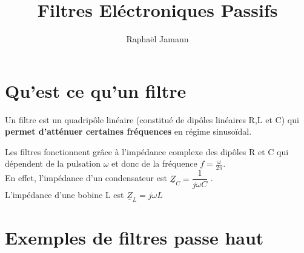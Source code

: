 \documentclass{article}
\title{Filtres Eléctroniques Passifs}
\author{Raphaël Jamann}
\date{} %
\begin{document}
    \maketitle


    \section{Qu'est ce qu'un filtre}
    
    Un filtre est un quadripôle linéaire (constitué de dipôles linéaires R,L et C) qui \textbf{permet
    d'atténuer certaines fréquences} en régime sinusoïdal. 

    \bigskip
    Les filtres fonctionnent grâce à l'impédance complexe des dipôles R et C qui dépendent
    de la pulsation $\omega$ et donc de la fréquence $f=\frac{\omega}{2\pi}$. \\
    En effet, l'impédance d'un condensateur est $\underline{Z}_C=\dfrac{1}{j\omega C}$ . \\
    L'impédance d'une bobine L est $\underline{Z}_L=j\omega L$


    \section{Exemples de filtres passe haut}
\end{document}
